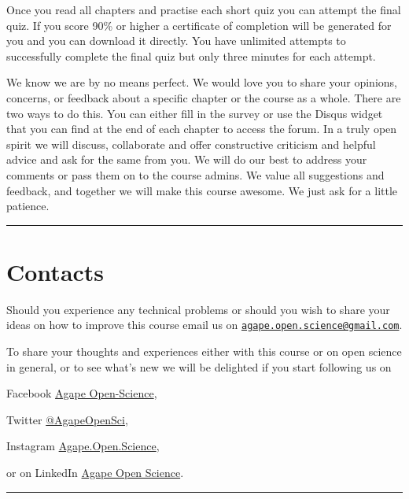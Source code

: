 \documentclass[
]{book}
\begin{document}
Once you read all chapters and practise each short quiz you can attempt the final quiz. If you score 90\% or higher a certificate of completion will be generated for you and you can download it directly. You have unlimited attempts to successfully complete the final quiz but only three minutes for each attempt.

We know we are by no means perfect. We would love you to share your opinions, concerns, or feedback about a specific chapter or the course as a whole. There are two ways to do this. You can either fill in the survey or use the Disqus widget that you can find at the end of each chapter to access the forum. In a truly open spirit we will discuss, collaborate and offer constructive criticism and helpful advice and ask for the same from you. We will do our best to address your comments or pass them on to the course admins. We value all suggestions and feedback, and together we will make this course awesome. We just ask for a little patience.

\begin{center}\rule{0.5\linewidth}{0.5pt}\end{center}

\hypertarget{contacts}{%
\section*{Contacts}\label{contacts}}

Should you experience any technical problems or should you wish to share your ideas on how to improve this course email us on {\href{mailto:agape.open.science@gmail.com}{\nolinkurl{agape.open.science@gmail.com}}}.

To share your thoughts and experiences either with this course or on open science in general, or to see what's new we will be delighted if you start following us on

Facebook {\href{https://facebook.com/AgapeOpen-Science}{Agape Open-Science}},

Twitter {\href{https://twitter.com/AgapeOpenSci}{@AgapeOpenSci}},

Instagram {\href{https://www.instagram.com/Agape.Open.Science}{Agape.Open.Science}},

or on LinkedIn {\href{https://www.linkedin.com/company/agape-open-science/}{Agape Open Science}}.

\begin{center}\rule{0.5\linewidth}{0.5pt}\end{center}
\end{document}

